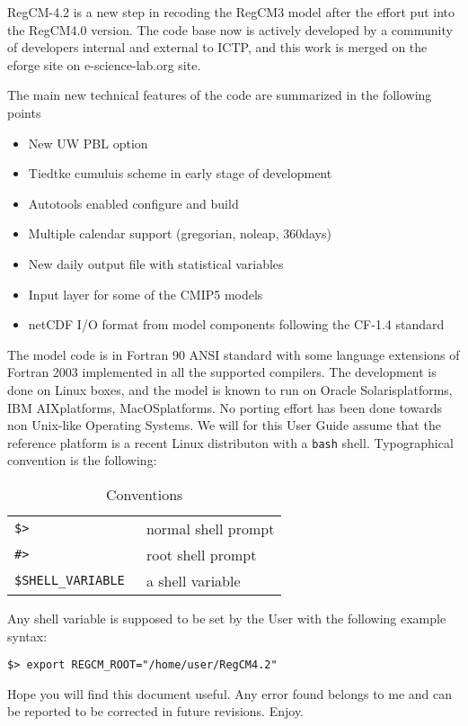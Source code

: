 %
%

RegCM-4.2 is a new step in recoding the RegCM3 model after the effort put into
the RegCM4.0 version. The code base now is actively developed by a community
of developers internal and external to ICTP, and this work is merged on the
eforge site on e-science-lab.org site.

The main new technical features of the code are summarized in the following
points

\begin{itemize}
\item New UW PBL option
\item Tiedtke cumuluis scheme in early stage of development
\item Autotools enabled configure and build
\item Multiple calendar support (gregorian, noleap, 360days)
\item New daily output file with statistical variables
\item Input layer for some of the CMIP5 models
\item netCDF I/O format from model components following the CF-1.4 standard
\end{itemize}

The model code is in Fortran 90 ANSI standard with some language extensions of
Fortran 2003 implemented in all the supported compilers.
The development is done on Linux boxes, and the model is known to run
on Oracle Solaris\texttrademark platforms, IBM AIX\texttrademark platforms,
MacOS\texttrademark platforms.
No porting effort has been done towards non Unix-like Operating Systems.
We will for this User Guide assume that the reference platform is a recent
Linux distributon with a \verb=bash= shell.
Typographical convention is the following:

\begin{table}[ht]
\caption{Conventions}
\vspace{0.05 in}
\centering
\begin{tabular}{l|l}
\hline
\verb=$> = & normal shell prompt \\
\verb=#> = & root shell prompt \\
\verb=$SHELL_VARIABLE = & a shell variable \\
\hline
\end{tabular}
\label{conventions}
\end{table}

Any shell variable is supposed to be set by the User with the following example
syntax:

\begin{Verbatim}
$> export REGCM_ROOT="/home/user/RegCM4.2"
\end{Verbatim}

Hope you will find this document useful. Any error found belongs to me and can
be reported to be corrected in future revisions. Enjoy.
